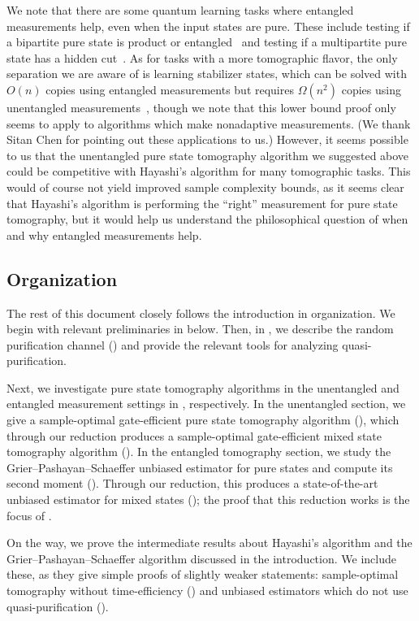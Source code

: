 \documentclass{article}
\begin{document}
We note that there are some quantum learning tasks where entangled measurements help, even when the input states are pure.
These include testing if a bipartite pure state is product or entangled~\cite{CCHL22,Har23}
and testing if a multipartite pure state has a hidden cut~\cite{BCS+25}.
As for tasks with a more tomographic flavor,
the only separation we are aware of is learning stabilizer states, which can be solved with $O(n)$ copies using entangled measurements but requires $\Omega(n^2)$ copies using unentangled measurements~\cite{ABDY23}, though we note that this lower bound proof only seems to apply to algorithms which make nonadaptive measurements.
(We thank Sitan Chen for pointing out these applications to us.)
However, it seems possible to us that the unentangled pure state tomography algorithm we suggested above could be competitive with Hayashi's algorithm for many tomographic tasks.
This would of course not yield improved sample complexity bounds, as it seems clear that Hayashi's algorithm is performing the ``right'' measurement for pure state tomography, but it would help us understand the philosophical question of when and why entangled measurements help.

\subsection{Organization}
The rest of this document closely follows the introduction in organization.
We begin with relevant preliminaries in  below.
Then, in , we describe the random purification channel () and provide the relevant tools for analyzing quasi-purification.

Next, we investigate pure state tomography algorithms in the unentangled and entangled measurement settings in , respectively.
In the unentangled section, we give a sample-optimal gate-efficient pure state tomography algorithm (), which through our reduction produces a sample-optimal gate-efficient mixed state tomography algorithm ().
In the entangled tomography section, we study the Grier--Pashayan--Schaeffer unbiased estimator for pure states and compute its second moment ().
Through our reduction, this produces a state-of-the-art unbiased estimator for mixed states (); the proof that this reduction works is the focus of .

On the way, we prove the intermediate results about Hayashi's algorithm and the Grier--Pashayan--Schaeffer algorithm discussed in the introduction.
We include these, as they give simple proofs of slightly weaker statements: sample-optimal tomography without time-efficiency () and unbiased estimators which do not use quasi-purification ().
\end{document}
